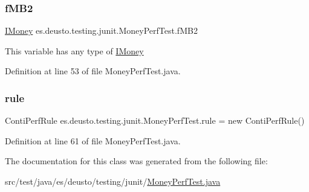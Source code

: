 \subsubsection{\texorpdfstring{fMB2}{fMB2}}
{\footnotesize\ttfamily \mbox{\hyperlink{interfacees_1_1deusto_1_1testing_1_1junit_1_1_i_money}{I\+Money}} es.\+deusto.\+testing.\+junit.\+Money\+Perf\+Test.\+f\+M\+B2}

This variable has any type of \mbox{\hyperlink{interfacees_1_1deusto_1_1testing_1_1junit_1_1_i_money}{I\+Money}} 

Definition at line 53 of file Money\+Perf\+Test.\+java.

\mbox{\label{classes_1_1deusto_1_1testing_1_1junit_1_1_money_perf_test_abe69d703cb5d31c06982cd9317f534bd}} 
\subsubsection{\texorpdfstring{rule}{rule}}
{\footnotesize\ttfamily Conti\+Perf\+Rule es.\+deusto.\+testing.\+junit.\+Money\+Perf\+Test.\+rule = new Conti\+Perf\+Rule()}



Definition at line 61 of file Money\+Perf\+Test.\+java.



The documentation for this class was generated from the following file\+:\begin{DoxyCompactItemize}
\item 
src/test/java/es/deusto/testing/junit/\mbox{\hyperlink{_money_perf_test_8java}{Money\+Perf\+Test.\+java}}\end{DoxyCompactItemize}
